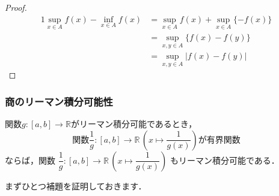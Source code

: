 \documentclass[./index]{subfiles}
\begin{document}
\begin{proof}
    \begin{alignat}{1}
        \sup_{x \in A} f(x) - \inf_{x \in A} f(x)
            &= \sup_{x \in A} f(x) + \sup_{x \in A} \{-f(x)\} \\
            &= \sup_{x,y \in A} \{f(x) - f(y)\} \\
            &= \sup_{x,y \in A} |f(x) - f(y)|
    \end{alignat}
\end{proof}

\subsubsection{商のリーマン積分可能性}

\begin{screen}
    \begin{lemma}
        \label{lemma:2}
        関数$g: [a, b] \rightarrow \mathbb{R}$がリーマン積分可能であるとき，
        \begin{equation}
            \label{lemma:2:0}
            \mbox{関数$\dfrac{1}{g}: [a, b] \rightarrow \mathbb{R} \, \left(x \mapsto \dfrac{1}{g(x)} \right)$が有界関数}
        \end{equation}
        ならば，関数
        $\dfrac{1}{g}: [a, b] \rightarrow \mathbb{R} \, \left(x \mapsto \dfrac{1}{g(x)}\right)$
        もリーマン積分可能である．
    \end{lemma}
\end{screen}

まずひとつ補題を証明しておきます．
\end{document}
